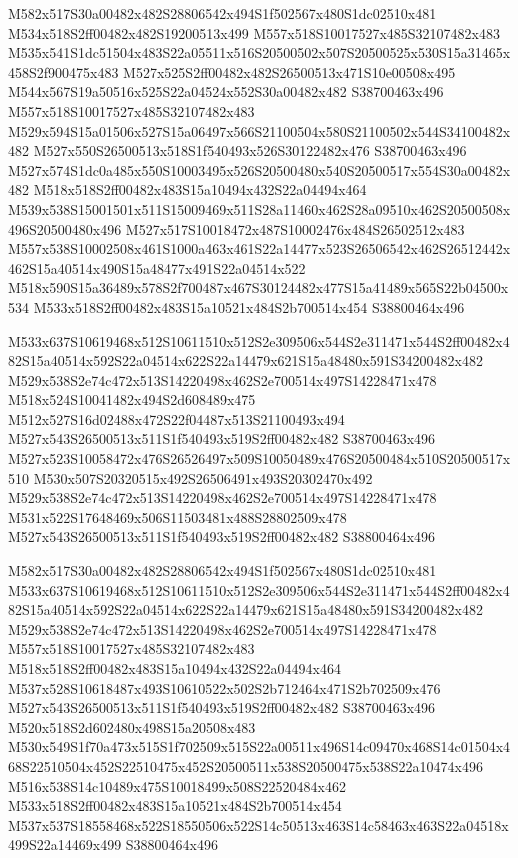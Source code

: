 \documentclass{article}
\begin{document}
\begin{multicols}{2}
M582x517S30a00482x482S28806542x494S1f502567x480S1dc02510x481 M534x518S2ff00482x482S19200513x499 M557x518S10017527x485S32107482x483 M535x541S1dc51504x483S22a05511x516S20500502x507S20500525x530S15a31465x458S2f900475x483 M527x525S2ff00482x482S26500513x471S10e00508x495 M544x567S19a50516x525S22a04524x552S30a00482x482 S38700463x496 M557x518S10017527x485S32107482x483 M529x594S15a01506x527S15a06497x566S21100504x580S21100502x544S34100482x482 M527x550S26500513x518S1f540493x526S30122482x476 S38700463x496 M527x574S1dc0a485x550S10003495x526S20500480x540S20500517x554S30a00482x482 M518x518S2ff00482x483S15a10494x432S22a04494x464 M539x538S15001501x511S15009469x511S28a11460x462S28a09510x462S20500508x496S20500480x496 M527x517S10018472x487S10002476x484S26502512x483 M557x538S10002508x461S1000a463x461S22a14477x523S26506542x462S26512442x462S15a40514x490S15a48477x491S22a04514x522 M518x590S15a36489x578S2f700487x467S30124482x477S15a41489x565S22b04500x534 M533x518S2ff00482x483S15a10521x484S2b700514x454 S38800464x496

M533x637S10619468x512S10611510x512S2e309506x544S2e311471x544S2ff00482x482S15a40514x592S22a04514x622S22a14479x621S15a48480x591S34200482x482 M529x538S2e74c472x513S14220498x462S2e700514x497S14228471x478 M518x524S10041482x494S2d608489x475 M512x527S16d02488x472S22f04487x513S21100493x494 M527x543S26500513x511S1f540493x519S2ff00482x482 S38700463x496 M527x523S10058472x476S26526497x509S10050489x476S20500484x510S20500517x510 M530x507S20320515x492S26506491x493S20302470x492 M529x538S2e74c472x513S14220498x462S2e700514x497S14228471x478 M531x522S17648469x506S11503481x488S28802509x478 M527x543S26500513x511S1f540493x519S2ff00482x482 S38800464x496

M582x517S30a00482x482S28806542x494S1f502567x480S1dc02510x481 M533x637S10619468x512S10611510x512S2e309506x544S2e311471x544S2ff00482x482S15a40514x592S22a04514x622S22a14479x621S15a48480x591S34200482x482 M529x538S2e74c472x513S14220498x462S2e700514x497S14228471x478 M557x518S10017527x485S32107482x483 M518x518S2ff00482x483S15a10494x432S22a04494x464 M537x528S10618487x493S10610522x502S2b712464x471S2b702509x476 M527x543S26500513x511S1f540493x519S2ff00482x482 S38700463x496 M520x518S2d602480x498S15a20508x483 M530x549S1f70a473x515S1f702509x515S22a00511x496S14c09470x468S14c01504x468S22510504x452S22510475x452S20500511x538S20500475x538S22a10474x496 M516x538S14c10489x475S10018499x508S22520484x462 M533x518S2ff00482x483S15a10521x484S2b700514x454 M537x537S18558468x522S18550506x522S14c50513x463S14c58463x463S22a04518x499S22a14469x499 S38800464x496


\end{multicols}
\end{document}
